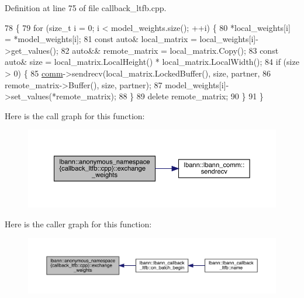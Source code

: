 Definition at line 75 of file callback\+\_\+ltfb.\+cpp.


\begin{DoxyCode}
78                                    \{
79   \textcolor{keywordflow}{for} (\textcolor{keywordtype}{size\_t} i = 0; i < model\_weights.size(); ++i) \{
80     *local\_weights[i] = *model\_weights[i];
81     \textcolor{keyword}{const} \textcolor{keyword}{auto}& local\_matrix = local\_weights[i]->get\_values();
82     \textcolor{keyword}{auto}&& remote\_matrix = local\_matrix.Copy();
83     \textcolor{keyword}{const} \textcolor{keyword}{auto}& size = local\_matrix.LocalHeight() * local\_matrix.LocalWidth();
84     \textcolor{keywordflow}{if} (size > 0) \{
85       \hyperlink{file__io_8cpp_ab048c6f9fcbcfaa57ce68b00263dbebe}{comm}->sendrecv(local\_matrix.LockedBuffer(), size, partner,
86                      remote\_matrix->Buffer(), size, partner);
87       model\_weights[i]->set\_values(*remote\_matrix);
88     \}
89     \textcolor{keyword}{delete} remote\_matrix;
90   \}
91 \}
\end{DoxyCode}
Here is the call graph for this function\+:\nopagebreak
\begin{figure}[H]
\begin{center}
\leavevmode
\includegraphics[width=350pt]{namespacelbann_1_1anonymous__namespace_02callback__ltfb_8cpp_03_a2b155d39e6dba02a34a7c58d804d865e_cgraph}
\end{center}
\end{figure}
Here is the caller graph for this function\+:\nopagebreak
\begin{figure}[H]
\begin{center}
\leavevmode
\includegraphics[width=350pt]{namespacelbann_1_1anonymous__namespace_02callback__ltfb_8cpp_03_a2b155d39e6dba02a34a7c58d804d865e_icgraph}
\end{center}
\end{figure}
